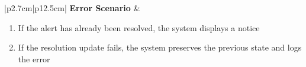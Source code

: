\begin{table}[H]
\begin{tabular}{|p{2.7cm}|p{12.5cm}|}
        \hline
        \textbf{Error Scenario} & \begin{minipage}[t]{\linewidth}
                                      \begin{enumerate}[topsep=0pt,itemsep=1pt,parsep=0pt,partopsep=0pt]
                                          \item If the alert has already been resolved, the system displays a notice
                                          \item If the resolution update fails, the system preserves the previous state and
                                                logs the error
                                      \end{enumerate}
                                  \end{minipage}                     \\
        \hline
    \end{tabular}
    \label{tab:admin-acknowledge-alert}
\end{table}
